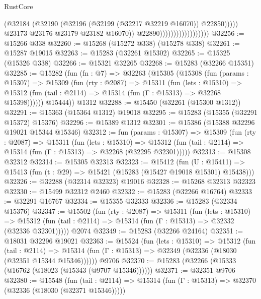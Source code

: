 \begin{lexlean}{RustCore}
\begin{coremodule}
                                                (@32184
                                                  (@32190
                                                    (@32196
                                                      (@32199 (@32217 @32219 @16070))
                                                      @22850)))))
                                            @23173
                                            @23176
                                            @23179
                                            @23182
                                            @16070))
                                        @22890))))))))))))))))))
@32256 := @15266 @338
@32260 := @15268 (@15272 @338) (@15278 @338)
@32261 := @15287 @19015
@32263 := @15283 (@32261 @15302)
@32265 := @15325 (@15326 @338)
@32266 := @15321 @32265
@32268 := @15283 (@32266 @15351)
@32285 := @15282
    (fun (fn : @7) =>
    @32263
      (@15305
        (@15308
          (fun (params : @15307) =>
          @15309
            (fun (rty : @2087) =>
            @15311
              (fun (lets : @15310) =>
              @15312 (fun (tail : @2114) => @15314 (fun (Γ : @15313) => @32268 @15398))))))
        @15444))
    @1312
@32288 := @15450 (@32261 (@15300 @1312))
@32291 := @15363 (@15364 @1312) @19018
@32295 := @15283 (@15355 (@32291 @15372) @15376)
@32296 := @15389 @1312
@32301 := @15386 (@15388 @32296 @19021 @15344 @15346)
@32312 := fun (params : @15307) =>
  @15309
    (fun (rty : @2087) =>
    @15311
      (fun (lets : @15310) =>
      @15312 (fun (tail : @2114) => @15314 (fun (Γ : @15313) => @32268 (@32295 @32301)))))
@32313 := @15308 @32312
@32314 := @15305 @32313
@32323 := @15412
    (fun (U : @15411) => @15413 (fun (t : @29) => @15421 (@15283 (@15427 @19018 @15301) @15438)))
@32326 := @32288 (@32314 @32323) @19016
@32328 := @15268 @32313 @32323
@32330 := @15499 @32312 @2460
@32332 := @15283 (@32266 @16764)
@32333 := @32291 @16767
@32334 := @15355 @32333
@32336 := @15283 (@32334 @15376)
@32347 := @15502
    (fun (rty : @2087) =>
    @15311
      (fun (lets : @15310) =>
      @15312 (fun (tail : @2114) => @15314 (fun (Γ : @15313) => @32332 (@32336 @32301)))))
    @2074
@32349 := @15283 (@32266 @24164)
@32351 := @18031 @32296 @19021
@32363 := @15524
    (fun (lets : @15310) =>
    @15312
      (fun (tail : @2114) =>
      @15314 (fun (Γ : @15313) => @32349 (@32336 (@18030 (@32351 @15344 @15346))))))
    @9706
@32370 := @15283 (@32266 (@15333 (@16762 (@18023 (@15343 (@9707 @15346))))))
@32371 := @32351 @9706
@32380 := @15548
    (fun (tail : @2114) => @15314 (fun (Γ : @15313) => @32370 (@32336 (@18030 (@32371 @15346)))))

\end{coremodule}
\end{lexlean}

